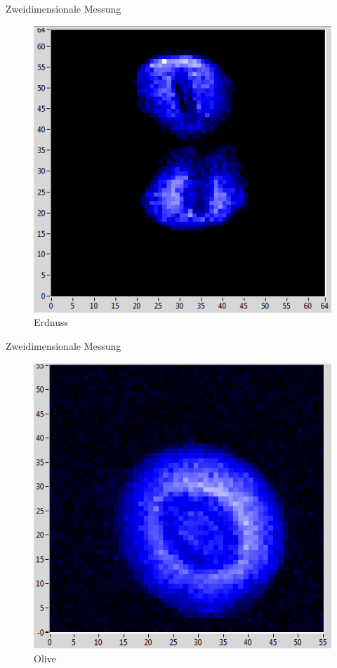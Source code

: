 \begin{frame}{Zweidimensionale Messung}
	\begin{figure}
	\centering
	\includegraphics[scale=.5]{..//figures//peanut.png}
	\caption{Erdnuss}
	\end{figure}
\end{frame}

\begin{frame}{Zweidimensionale Messung}
	\begin{figure}
	\centering
	\includegraphics[scale=.5]{..//figures//olive.png}
	\caption{Olive}
	\end{figure}
\end{frame}




